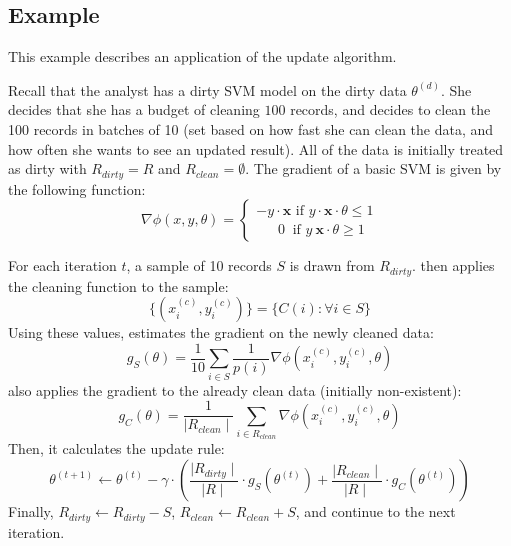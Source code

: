 \subsection{Example}
This example describes an application of the update algorithm.
\begin{example}\label{upex}
Recall that the analyst has a dirty SVM model on the dirty data $\theta^{(d)}$.
She decides that she has a budget of cleaning $100$ records, and decides to clean the 100 records in batches of 10 (set based on how fast she can clean the data, and how often she wants to see an updated result).
All of the data is initially treated as dirty with $R_{dirty} = R$ and $R_{clean} = \emptyset$.
The gradient of a basic SVM is given by the following function:
\[
\nabla\phi(x,y,\theta) =
\begin{cases}      
-y\cdot\boldsymbol{x} \text{ if } y\cdot\boldsymbol{x}\cdot\theta \le 1 \\
~~~~~~~0\ \text{ if } y\ \boldsymbol{x}\cdot\theta \geq 1      
\end{cases}
\]

For each iteration $t$, a sample of 10 records $S$ is drawn from $R_{dirty}$.
\sys then applies the cleaning function to the sample:
\[
\{(x_i^{(c)},y_i^{(c)})\} = \{C(i): \forall i \in S\}
\]
Using these values, \sys estimates the gradient on the newly cleaned data:
\[
g_{S}(\theta) = \frac{1}{10} \sum_{i \in S}\frac{1}{p(i)}\nabla\phi(x_i^{(c)},y_i^{(c)},\theta)
\]
\sys also applies the gradient to the already clean data (initially non-existent):
\[
g_C(\theta) = \frac{1}{\mid R_{clean}\mid}\sum_{i \in R_{clean}}\nabla\phi(x_i^{(c)},y_i^{(c)},\theta)
\]
Then, it calculates the update rule:
\[
	\theta^{(t+1)} \leftarrow \theta^{(t)} - \gamma \cdot(\frac{\mid R_{dirty} \mid}{\mid R \mid} \cdot g_S(\theta^{(t)}) + \frac{\mid R_{clean} \mid}{\mid R \mid} \cdot  g_C(\theta^{(t)}))
\] 
Finally, $R_{dirty} \leftarrow R_{dirty} - S$, $R_{clean} \leftarrow R_{clean} + S$, and continue to the next iteration.
\end{example}
